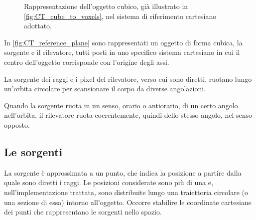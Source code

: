 \documentclass[12pt,a4paper]{report}
\begin{document}
\begin{figure}[H]
{
  }
  \caption{\label{fig:CT_reference_plane} Rappresentazione dell'oggetto cubico, già illustrato in \autoref{fig:CT_cube_to_voxels},
           nel sistema di riferimento cartesiano adottato.}
\end{figure}

In \autoref{fig:CT_reference_plane} sono rappresentati un oggetto di forma cubica, la sorgente e il rilevatore, tutti posti
in uno specifico sistema cartesiano in cui il centro dell'oggetto corrisponde con l'origine degli assi.

La sorgente dei raggi e i pixel del rilevatore, verso cui sono diretti, ruotano lungo un'orbita circolare per scansionare il corpo
da diverse angolazioni.

Quando la sorgente ruota in un senso, orario o antiorario, di un certo angolo nell'orbita, il rilevatore ruota coerentemente,
quindi dello stesso angolo, nel senso opposto.

\subsection{Le sorgenti} \label{subsec:sources}

La sorgente è approssimata a un punto, che indica la posizione a partire dalla quale sono diretti i raggi.
Le posizioni considerate sono più di una e, nell'implementazione trattata, sono distribuite lungo una traiettoria circolare
(o una sezione di essa) intorno all'oggetto.
Occorre stabilire le coordinate cartesiane dei punti che rappresentano le sorgenti nello spazio.
\end{document}

